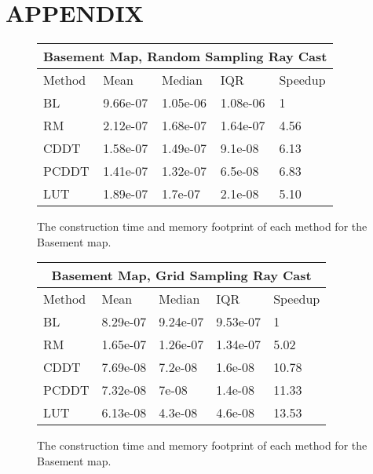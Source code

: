 \documentclass[letterpaper, 10 pt, conference]{ieeeconf}  %
\begin{document}
\section*{APPENDIX}

\begin{figure}[h]
\begin{center}
\begin{tabular}{ | m{1.05cm} | m{1.3cm}| m{1.6cm} | m{1.25cm} | m{1.25cm}|  } 
\hline
\multicolumn{5}{|c|}{Basement Map, Random Sampling Ray Cast} \\
\hline
Method & Mean & Median & IQR & Speedup \\
\hline
BL & 9.66e-07 & 1.05e-06 & 1.08e-06 & 1 \\
RM & 2.12e-07 & 1.68e-07 & 1.64e-07 & 4.56 \\
CDDT & 1.58e-07 & 1.49e-07 & 9.1e-08 & 6.13 \\
PCDDT & 1.41e-07 & 1.32e-07 & 6.5e-08 & 6.83 \\
LUT & 1.89e-07 & 1.7e-07 & 2.1e-08 & 5.10 \\
\hline
\end{tabular}
\end{center}
\caption{The construction time and memory footprint of each method for the Basement map.}
\label{table:basement:init}
\end{figure}

\begin{figure}[h]
\begin{center}
\begin{tabular}{ | m{1.05cm} | m{1.3cm}| m{1.6cm} | m{1.25cm} | m{1.25cm}|  } 
\hline
\multicolumn{5}{|c|}{Basement Map, Grid Sampling Ray Cast} \\
\hline
Method & Mean & Median & IQR & Speedup \\
\hline
BL & 8.29e-07 & 9.24e-07 & 9.53e-07 & 1 \\
RM & 1.65e-07 & 1.26e-07 & 1.34e-07 & 5.02 \\
CDDT & 7.69e-08 & 7.2e-08 & 1.6e-08 & 10.78 \\
PCDDT & 7.32e-08 & 7e-08 & 1.4e-08 & 11.33 \\
LUT & 6.13e-08 & 4.3e-08 & 4.6e-08 & 13.53 \\
\hline
\end{tabular}
\end{center}
\caption{The construction time and memory footprint of each method for the Basement map.}
\label{table:basement:init}
\end{figure}
\end{document}
